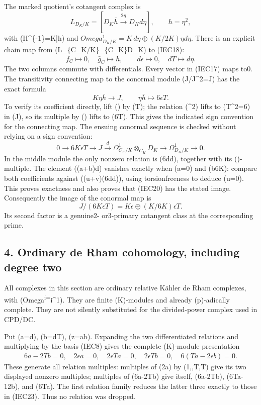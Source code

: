 \documentclass[
  10pt,
]{article}
\begin{document}
The marked quotient's cotangent complex is \[
L_{D_K/K}=[D_K\bar h\xrightarrow{2\eta}D_Kd\eta],\qquad h=\eta^2,
\tag{IEC18}
\] with (H\^{}\{-1\}=K\eta\bar h) and
\(Omega^1_{D_K/K}=K\,d\eta\oplus(K/2K)\eta d\eta\). There is an explicit
chain map from (L\_\{C\_K/K\}\otimes\_\{C\_K\}D\_K) to (IEC18): \[
\bar f_C\mapsto0,\quad\bar g_C\mapsto\bar h,
\qquad d\epsilon\mapsto0,\quad dT\mapsto d\eta.
\tag{IEC19}
\] The two columns commute with differentials. Every vector in (IEC17)
maps to0. The transitivity connecting map to the conormal module
(J/J\^{}2=J) has the exact formula \[
K\eta\bar h\longrightarrow J,\qquad
\eta\bar h\longmapsto6\epsilon T.
\tag{IEC20}
\] To verify its coefficient directly, lift (\eta) by (T); the relation
(\eta\^{}2) lifts to (T\^{}2=6\epsilon) in (J), so its multiple by
(\eta) lifts to (6\epsilon T). This gives the indicated sign convention
for the connecting map. The ensuing conormal sequence is checked without
relying on a sign convention: \[
0\longrightarrow6K\epsilon T\longrightarrow J
\xrightarrow{d} \Omega^1_{C_K/K}\otimes_{C_K}D_K
\longrightarrow\Omega^1_{D_K/K}\longrightarrow0.
\tag{IEC21}
\] In the middle module the only nonzero relation is
(6d\eta d), together with its (\eta)-multiple. The
element ((a+b\eta)d\epsilon) vanishes exactly when (a=0) and (b\in6K):
compare both coefficients against ((u+v\eta)(6d\eta d\eta)),
using torsionfreeness to deduce (u=0). This proves exactness and also
proves that (IEC20) has the stated image. Consequently the image of the
conormal map is \[
J/(6K\epsilon T)=K\epsilon\oplus(K/6K)\epsilon T.
\tag{IEC22}
\] Its second factor is a genuine2- or3-primary cotangent class at the
corresponding prime.

\subsection{4. Ordinary de Rham cohomology, including degree
two}\label{ordinary-de-rham-cohomology-including-degree-two}

All complexes in this section are ordinary relative Kähler de Rham
complexes, with (Omega\textsuperscript{i=\bigwedge}i\Omega\^{}1). They
are finite (K)-modules and already (p)-adically complete. They are not
silently substituted for the divided-power complex used in CPD/DC.

Put (a=d\epsilon), (b=dT), (z=a\wedge b). Expanding the two
differentiated relations and multiplying by the basis (IEC8) gives the
complete (K)-module presentation \[
\begin{gathered}
6a-2Tb=0,\quad 2\epsilon a=0,\quad2\epsilon T a=0,
\quad2\epsilon T b=0,\quad6(Ta-2\epsilon b)=0.
\end{gathered}
\tag{IEC23}
\] These generate all relation multiples: multiples of (2\epsilon a) by
(1,\epsilon,T,\epsilon T) give its two displayed nonzero multiples;
multiples of (6a-2Tb) give itself, (6\epsilon a-2\epsilon Tb),
(6Ta-12\epsilon b), and (6\epsilon Ta). The first relation family
reduces the latter three exactly to those in (IEC23). Thus no relation
was dropped.
\end{document}
